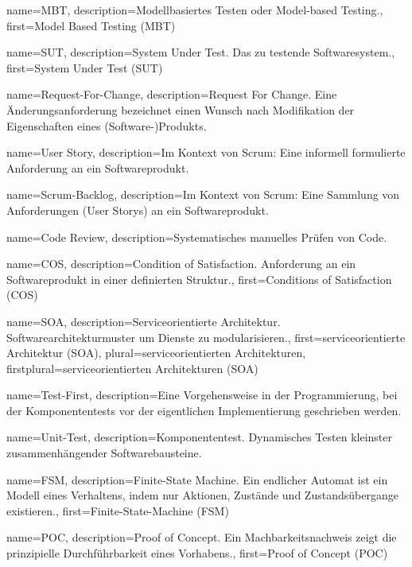  {
	name={MBT},
	description={Modellbasiertes Testen oder Model-based Testing.},
	first={Model Based Testing (MBT)}
}

 {
	name={SUT},
	description={System Under Test. Das zu testende Softwaresystem.},
	first={System Under Test (SUT)}
}

 {
	name={Request-For-Change},
	description={Request For Change. Eine Änderungsanforderung bezeichnet einen  Wunsch nach Modifikation der Eigenschaften eines (Software-)Produkts.}
}

 {
	name={User Story},
	description={Im Kontext von Scrum: Eine informell formulierte Anforderung an ein Softwareprodukt.}
}

 {
	name={Scrum-Backlog},
	description={Im Kontext von Scrum: Eine Sammlung von Anforderungen (User Storys) an ein Softwareprodukt.}
}

 {
	name={Code Review},
	description={Systematisches manuelles Prüfen von Code.}
}

 {
	name={COS},
	description={Condition of Satisfaction. Anforderung an ein Softwareprodukt in einer definierten Struktur.},
	first={Conditions of Satisfaction (COS)}
}

 {
	name={SOA},
	description={Serviceorientierte Architektur. Softwarearchitekturmuster um Dienste zu modularisieren.},
	first={serviceorientierte Architektur (SOA)},
	plural={serviceorientierten Architekturen},
	firstplural={serviceorientierten Architekturen (SOA)}
}

 {
	name={Test-First},
	description={Eine Vorgehensweise in der Programmierung, bei der Komponententests vor der eigentlichen Implementierung geschrieben werden.}
}

 {
	name={Unit-Test},
	description={Komponententest. Dynamisches Testen kleinster zusammenhängender Softwarebausteine.}
}

 {
	name={FSM},
	description={Finite-State Machine. Ein endlicher Automat ist ein Modell eines Verhaltens, indem nur Aktionen, Zustände und Zustandsübergange existieren.},
	first={Finite-State-Machine (FSM)}
}

 {
	name={POC},
	description={Proof of Concept. Ein Machbarkeitsnachweis zeigt die prinzipielle Durchführbarkeit eines Vorhabens.},
	first={Proof of Concept (POC)}
}

